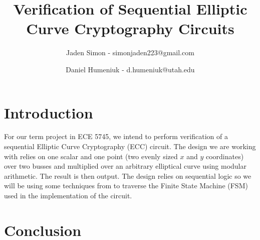 \documentclass[12pt]{report}
\title{Verification of Sequential Elliptic Curve Cryptography Circuits}
\author{Jaden Simon - simonjaden223@gmail.com \\ \and
	   Daniel Humeniuk - d.humeniuk@utah.edu}
\begin{document}
\maketitle

\section{Introduction}

For our term project in ECE 5745, we intend to perform verification of a sequential Elliptic Curve Cryptography (ECC) circuit. The design we are working with relies on  one scalar and one point (two evenly sized $x$ and $y$ coordinates) over two busses and multiplied over an arbitrary elliptical curve using modular arithmetic. The result is then output. The design relies on sequential logic so we will be using some techniques from \cite{Kalla} to traverse the Finite State Machine (FSM) used in the implementation of the circuit.
\section{Conclusion}




\end{document}

